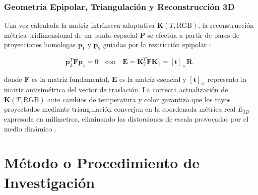 \documentclass[12pt,letterpaper,spanish,twoside,openright]{report}
\begin{document}
\subsection{Geometría Epipolar, Triangulación y Reconstrucción 3D}

Una vez calculada la matriz intrínseca adaptativa $\mathbf{K}(T, \text{RGB})$, la reconstrucción métrica tridimensional de un punto espacial $\mathbf{P}$ se efectúa a partir de pares de proyecciones homologas $\mathbf{p}_1$ y $\mathbf{p}_2$ guiadas por la restricción epipolar \parencite{Hartley2004}:

\begin{equation}
\mathbf{p}_2^T \mathbf{F} \mathbf{p}_1 = 0 \quad \text{con} \quad \mathbf{E} = \mathbf{K}_2^T \mathbf{F} \mathbf{K}_1 = [\mathbf{t}]_\times \mathbf{R}
\end{equation}

donde $\mathbf{F}$ es la matriz fundamental, $\mathbf{E}$ es la matriz esencial y $[\mathbf{t}]_\times$ representa la matriz antisimétrica del vector de traslación. La correcta actualización de $\mathbf{K}(T, \text{RGB})$ ante cambios de temperatura y color garantiza que los rayos proyectados mediante triangulación converjan en la coordenada métrica real $E_{3D}$ expresada en milímetros, eliminando las distorsiones de escala provocadas por el medio dinámico \parencite{10772075, Meng:24}.


\chapter{Método o Procedimiento de Investigación}
\end{document}
